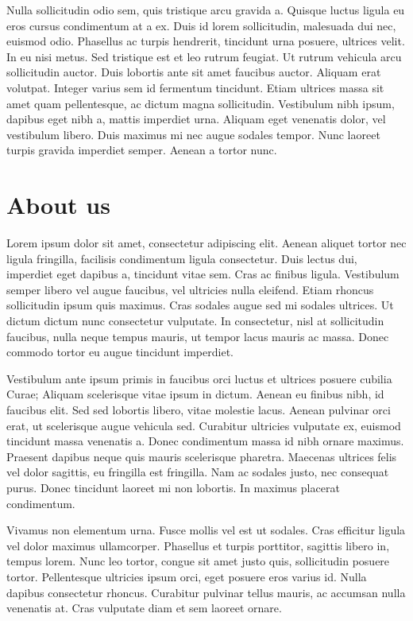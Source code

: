 \documentclass[letterpaper,10pt,english]{sphinxmanual}
\begin{document}
Nulla sollicitudin odio sem, quis tristique arcu gravida a. Quisque luctus ligula eu eros cursus condimentum at a ex. Duis id lorem sollicitudin, malesuada dui nec, euismod odio. Phasellus ac turpis hendrerit, tincidunt urna posuere, ultrices velit. In eu nisi metus. Sed tristique est et leo rutrum feugiat. Ut rutrum vehicula arcu sollicitudin auctor. Duis lobortis ante sit amet faucibus auctor. Aliquam erat volutpat. Integer varius sem id fermentum tincidunt. Etiam ultrices massa sit amet quam pellentesque, ac dictum magna sollicitudin. Vestibulum nibh ipsum, dapibus eget nibh a, mattis imperdiet urna. Aliquam eget venenatis dolor, vel vestibulum libero. Duis maximus mi nec augue sodales tempor. Nunc laoreet turpis gravida imperdiet semper. Aenean a tortor nunc.


\chapter{About us}
\label{about_us::doc}\label{about_us:about-us}
Lorem ipsum dolor sit amet, consectetur adipiscing elit. Aenean aliquet tortor nec ligula fringilla, facilisis condimentum ligula consectetur. Duis lectus dui, imperdiet eget dapibus a, tincidunt vitae sem. Cras ac finibus ligula. Vestibulum semper libero vel augue faucibus, vel ultricies nulla eleifend. Etiam rhoncus sollicitudin ipsum quis maximus. Cras sodales augue sed mi sodales ultrices. Ut dictum dictum nunc consectetur vulputate. In consectetur, nisl at sollicitudin faucibus, nulla neque tempus mauris, ut tempor lacus mauris ac massa. Donec commodo tortor eu augue tincidunt imperdiet.

Vestibulum ante ipsum primis in faucibus orci luctus et ultrices posuere cubilia Curae; Aliquam scelerisque vitae ipsum in dictum. Aenean eu finibus nibh, id faucibus elit. Sed sed lobortis libero, vitae molestie lacus. Aenean pulvinar orci erat, ut scelerisque augue vehicula sed. Curabitur ultricies vulputate ex, euismod tincidunt massa venenatis a. Donec condimentum massa id nibh ornare maximus. Praesent dapibus neque quis mauris scelerisque pharetra. Maecenas ultrices felis vel dolor sagittis, eu fringilla est fringilla. Nam ac sodales justo, nec consequat purus. Donec tincidunt laoreet mi non lobortis. In maximus placerat condimentum.

Vivamus non elementum urna. Fusce mollis vel est ut sodales. Cras efficitur ligula vel dolor maximus ullamcorper. Phasellus et turpis porttitor, sagittis libero in, tempus lorem. Nunc leo tortor, congue sit amet justo quis, sollicitudin posuere tortor. Pellentesque ultricies ipsum orci, eget posuere eros varius id. Nulla dapibus consectetur rhoncus. Curabitur pulvinar tellus mauris, ac accumsan nulla venenatis at. Cras vulputate diam et sem laoreet ornare.
\end{document}
